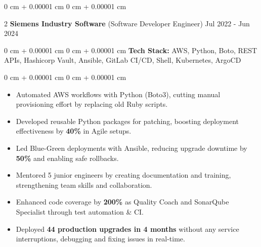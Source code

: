 \documentclass[9pt, letterpaper]{article}
\newenvironment{highlights}{
    \begin{itemize}[
        topsep=0.05 cm,
        parsep=0 pt,
        partopsep=0pt,
        itemsep=0pt,
        leftmargin=10pt
    ]
}{
    \end{itemize}
} %
\newenvironment{onecolentry}{
    \begin{adjustwidth}{
        0 cm + 0.00001 cm}{
        0 cm + 0.00001 cm}
}{
    \end{adjustwidth}
} %
\newenvironment{twocolentry}[2][]{
    \onecolentry
    \def\secondColumn{#2}
    \setcolumnwidth{\fill, 4.5 cm}
    \begin{paracol}{2}
}{
    \switchcolumn \raggedleft \secondColumn
    \end{paracol}
    \endonecolentry
} %
\begin{document}
    \begin{twocolentry}{Jul 2022 - Jun 2024}\textbf{Siemens Industry Software} (Software Developer Engineer)\end{twocolentry}
    \begin{onecolentry}\textbf{Tech Stack:} AWS, Python, Boto, REST APIs, Hashicorp Vault, Ansible, GitLab CI/CD, Shell, Kubernetes, ArgoCD \end{onecolentry}
    \begin{onecolentry}
        \begin{highlights}
            \item Automated AWS workflows with Python (Boto3), cutting manual provisioning effort by replacing old Ruby scripts.
            \item Developed reusable Python packages for patching, boosting deployment effectiveness by \textbf{40\%} in Agile setups.
            \item Led Blue-Green deployments with Ansible, reducing upgrade downtime by \textbf{50\%} and enabling safe rollbacks.
            \item Mentored 5 junior engineers by creating documentation and training, strengthening team skills and collaboration.
            \item Enhanced code coverage by \textbf{200\%} as Quality Coach and SonarQube Specialist through test automation \& CI.
            \item Deployed \textbf{44 production upgrades in 4 months} without any service interruptions, debugging and fixing issues in real-time.
        \end{highlights}
    \end{onecolentry}
\end{document}
